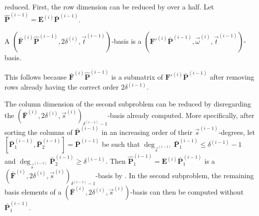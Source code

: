 reduced. First, the row dimension can be reduced by over a half. Let
$\hat{\mathbf{P}}^{\left(i-1\right)}=\mathbf{E}^{\left(i\right)}\bar{\mathbf{P}}^{\left(i-1\right)}$. 
\begin{lem}
\label{lem:simplifySecondSubproblem}A $(\bar{\mathbf{F}}^{\left(i\right)}\hat{\mathbf{P}}^{\left(i-1\right)},2\delta^{\left(i\right)},\vec{t}^{\left(i-1\right)})$-basis
is a $(\mathbf{F}'^{\left(i\right)}\bar{\mathbf{P}}^{\left(i-1\right)},\vec{\omega}^{\left(i\right)},\vec{t}^{\left(i-1\right)})$-basis.\end{lem}
\begin{pf}
This follows because $\bar{\mathbf{F}}^{\left(i\right)}\hat{\mathbf{P}}^{\left(i-1\right)}$
is a submatrix of $\mathbf{F}'^{\left(i\right)}\bar{\mathbf{P}}^{\left(i-1\right)}$
after removing rows already having the correct order $2\delta^{\left(i-1\right)}$. 
\end{pf}
The column dimension of the second subproblem can be reduced by disregarding
the $(\bar{\mathbf{F}}^{\left(i\right)},2\delta^{\left(i\right)},\vec{s}^{\left(i\right)})_{\delta^{\left(i-1\right)}-1}$-basis
already computed. More specifically, after sorting the columns of
$\bar{\mathbf{P}}^{\left(i-1\right)}$ in an increasing order of their
$\vec{s}^{\left(i-1\right)}$-degrees, let $[\bar{\mathbf{P}}_{1}^{\left(i-1\right)},\bar{\mathbf{P}}_{2}^{\left(i-1\right)}]=\bar{\mathbf{P}}^{\left(i-1\right)}$
be such that $\deg_{\vec{s}^{\left(i-1\right)}}\bar{\mathbf{P}}_{1}^{\left(i-1\right)}\le\delta^{\left(i-1\right)}-1$
and $\deg_{\vec{s}^{\left(i-1\right)}}\bar{\mathbf{P}}_{2}^{\left(i-1\right)}\ge\delta^{\left(i-1\right)}$.
Then $\hat{\mathbf{P}}_{1}^{\left(i-1\right)}=\mathbf{E}^{\left(i\right)}\bar{\mathbf{P}}_{1}^{\left(i-1\right)}$
is a $(\bar{\mathbf{F}}^{\left(i\right)},2\delta^{\left(i\right)},\vec{s}^{\left(i\right)})_{\delta^{\left(i-1\right)}-1}$-basis
by . In the second subproblem,
the remaining basis elements of a $(\bar{\mathbf{F}}^{\left(i\right)},2\delta^{\left(i\right)},\vec{s}^{\left(i\right)})$-basis
can then be computed without $\bar{\mathbf{P}}_{1}^{\left(i-1\right)}$.

